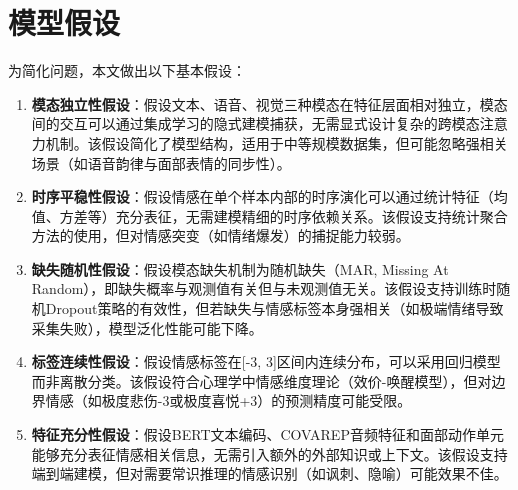 \section{模型假设}


为简化问题，本文做出以下基本假设：
\begin{enumerate}
    \item \textbf{模态独立性假设}：假设文本、语音、视觉三种模态在特征层面相对独立，模态间的交互可以通过集成学习的隐式建模捕获，无需显式设计复杂的跨模态注意力机制。该假设简化了模型结构，适用于中等规模数据集，但可能忽略强相关场景（如语音韵律与面部表情的同步性）。

    \item \textbf{时序平稳性假设}：假设情感在单个样本内部的时序演化可以通过统计特征（均值、方差等）充分表征，无需建模精细的时序依赖关系。该假设支持统计聚合方法的使用，但对情感突变（如情绪爆发）的捕捉能力较弱。

    \item \textbf{缺失随机性假设}：假设模态缺失机制为随机缺失（MAR, Missing At Random），即缺失概率与观测值有关但与未观测值无关。该假设支持训练时随机Dropout策略的有效性，但若缺失与情感标签本身强相关（如极端情绪导致采集失败），模型泛化性能可能下降。

    \item \textbf{标签连续性假设}：假设情感标签在[-3, 3]区间内连续分布，可以采用回归模型而非离散分类。该假设符合心理学中情感维度理论（效价-唤醒模型），但对边界情感（如极度悲伤-3或极度喜悦+3）的预测精度可能受限。

    \item \textbf{特征充分性假设}：假设BERT文本编码、COVAREP音频特征和面部动作单元能够充分表征情感相关信息，无需引入额外的外部知识或上下文。该假设支持端到端建模，但对需要常识推理的情感识别（如讽刺、隐喻）可能效果不佳。
\end{enumerate}

